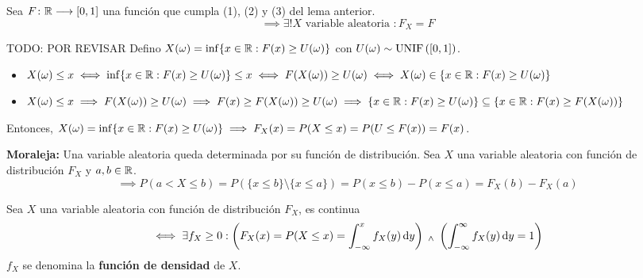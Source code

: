 \begin{teo}
	Sea $F \colon \mathbb{R} \longrightarrow [0, 1]$ una función que cumpla (1), (2) y (3) del lema anterior.
	\[\implies \exists! X \text{ variable aleatoria } : F_X = F\]
	\begin{dem} TODO: POR REVISAR
		Defino $X(\omega) = \inf\{x\in\mathbb{R} : F(x) \geq U(\omega)\}$ con $U(\omega) \sim \operatorname{UNIF}\left([0,1]\right)$.
		\begin{itemize}
			\item $X(\omega) \leq x \iff \inf\{x\in\mathbb{R} : F(x) \geq U(\omega)\} \leq x \iff F(X(\omega)) \geq U(\omega) \iff X(\omega) \in \{x\in\mathbb{R} : F(x) \geq U(\omega)\}$
			\item $X(\omega) \leq x \implies F(X(\omega)) \geq U(\omega) \implies F(x) \geq F(X(\omega)) \geq U(\omega) \implies \{x\in\mathbb{R} : F(x) \geq U(\omega)\} \subseteq \{x\in\mathbb{R} : F(x) \geq F(X(\omega))\}$
		\end{itemize}
		Entonces, $X(\omega) = \inf\{x\in\mathbb{R} : F(x) \geq U(\omega)\} \implies F_X(x) = P(X\leq x) = P(U\leq F(x)) = F(x)$.
	\end{dem}
\end{teo}
\textbf{Moraleja:} Una variable aleatoria queda determinada por su función de distribución.
Sea $X$ una variable aleatoria con función de distribución $F_X$ y $a,b\in \mathbb{R}$.
\[\implies P(a<X\leq b)=P(\{x\leq b\}\setminus \{x\leq a\}) = P(x\leq b) - P(x\leq a) = F_X(b)-F_X(a)\]
\begin{defn}
	Sea $X$ una variable aleatoria con función de distribución $F_X$, es continua
	\[\iff \exists f_X \geq 0 : \left(F_X(x) = P(X\leq x)=\int_{-\infty}^{x} f_X(y) \odif{y}\right) \we \left(\int_{-\infty}^{\infty} f_X(y) \odif{y}=1\right)\]
	$f_X$ se denomina la \textbf{función de densidad} de $X$.
\end{defn}

